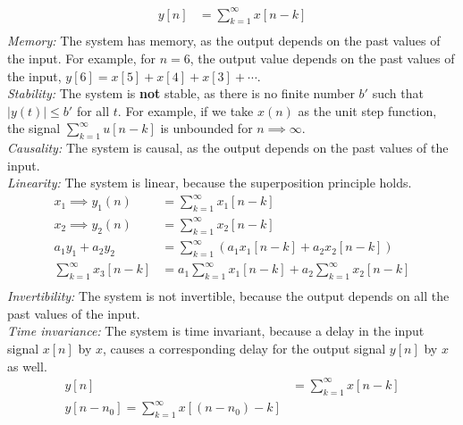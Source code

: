 \documentclass[10pt,a4paper, margin=1in]{article}
\begin{document}
\begin{enumerate}
\begin{enumerate}
        \begin{align*}
            y[n] & = \sum_{k = 1}^{\infty} x[n - k] \\
        \end{align*}
        \textit{Memory: } The system has memory, as the output depends on the past values of the input.
        For example, for $n = 6$, the output value depends on the past values of the input,
        $y[6] = x[5] + x[4] + x[3] + \cdots$.\\
        \textit{Stability: } The system is \textbf{not} stable, as there is no finite number $b'$ such that $|y(t)| \leq b'$ for all $t$.
        For example, if we take $x(n)$ as the unit step function, the signal $\sum_{k = 1}^{\infty} u[n - k]$ is unbounded for $n \implies \infty$.\\
        \textit{Causality: } The system is causal, as the output depends on the past values of the input.\\
        \textit{Linearity: } The system is linear, because the superposition principle holds.\\
        \begin{align*}
            x_1 \implies y_1(n) & = \sum_{k = 1}^{\infty} x_1[n - k] \\
            x_2 \implies y_2(n) & = \sum_{k = 1}^{\infty} x_2[n - k] \\
            a_1y_1 + a_2y_2 & = \sum_{k = 1}^{\infty} (a_1x_1[n - k] + a_2x_2[n - k])\\
            \sum_{k = 1}^{\infty} x_3[n - k] & = a_1\sum_{k = 1}^{\infty} x_1[n - k] + a_2\sum_{k = 1}^{\infty} x_2[n - k] \\ 
        \end{align*}
        \textit{Invertibility: } The system is not invertible, because the output depends on all the past values of the input.\\
        \textit{Time invariance: } The system is time invariant, because a delay in the input signal $x[n]$ by $x$, causes a
        corresponding delay for the output signal $y[n]$ by $x$ as well.\\
        \begin{align*}
            y[n] & = \sum_{k = 1}^{\infty} x[n - k] \\
            y[n- n_0] = \sum_{k = 1}^{\infty} x[(n - n_0) - k]\\
        \end{align*}
        \end{enumerate}
    

\end{enumerate}
\end{document}
